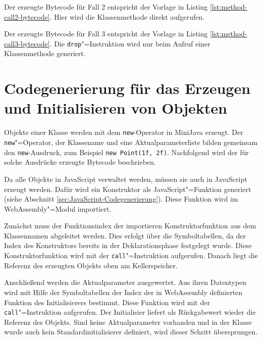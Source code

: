 Der erzeugte Bytecode für Fall 2 entspricht der Vorlage in Listing \ref{lst:method-call2-bytecode}. Hier wird die Klassenmethode direkt aufgerufen. 



Der erzeugte Bytecode für Fall 3 entspricht der Vorlage in Listing \ref{lst:method-call3-bytecode}. Die \lstinline{drop}"=Instruktion wird nur beim Aufruf einer Klassenmethode generiert.



\section{Codegenerierung für das Erzeugen und Initialisieren von Objekten}
\label{sec:Codegenerierung-für-das-Erzeugen-und-Initialisieren-von-Objekten}
Objekte einer Klasse werden mit dem \lstinline{new}-Operator in MiniJava erzeugt. Der \lstinline{new}"=Operator, der Klassename und eine Aktualparameterliste bilden gemeinsam den \lstinline{new}-Ausdruck, zum Beispiel \lstinline{new Point(1f, 2f)}. Nachfolgend wird der für solche Ausdrücke erzeugte Bytecode beschrieben.

Da alle Objekte in JavaScript verwaltet werden, müssen sie auch in JavaScript erzeugt werden. Dafür wird ein Konstruktor als JavaScript"=Funktion generiert (siehe Abschnitt \ref{sec:JavaScript-Codegenerierung}). Diese Funktion wird im WebAssembly"=Modul importiert.

Zunächst muss der Funktionsindex der importieren Konstruktorfunktion aus dem Klassennamen abgeleitet werden. Dies erfolgt über die Symboltabellen, da der Index des Konstruktors bereits in der Deklarationsphase festgelegt wurde. Diese Konstruktorfunktion wird mit der \lstinline{call}"=Instruktion aufgerufen. Danach liegt die Referenz des erzeugten Objekts oben am Kellerspeicher.

Anschließend werden die Aktualparameter ausgewertet. Aus ihren Datentypen wird mit Hilfe der Symboltabellen der Index der in WebAssembly definierten Funktion des Initialisierers bestimmt. Diese Funktion wird mit der \lstinline{call}"=Instruktion aufgerufen. Der Initialisier liefert als Rückgabewert wieder die Referenz des Objekts. Sind keine Aktualparameter vorhanden und in der Klasse wurde auch kein Standardinitialisierer definiert, wird dieser Schritt übersprungen.

